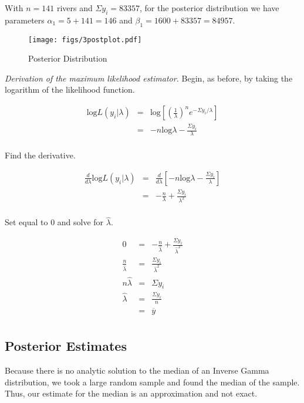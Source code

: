 \documentclass[12pt]{article}
\newcommand{\ybar}{\overline{y}}
\begin{document}
\noindent With $n=141$ rivers and $\Sigma y_i=83357$, for the posterior distribution we have parameters $\alpha_1=5+141=146$ and $\beta_1=1600+83357=84957$. \\ [-.85cm]

\begin{figure}[H]
\begin{center}
\texttt{[image: figs/3postplot.pdf]}
\caption{Posterior Distribution}
\end{center}
\end{figure}

\noindent \textit{Derivation of the maximum likelihood estimator.}  Begin, as before, by taking the logarithm of the likelihood function.

\begin{eqnarray*}
\mathrm{log}L(y_i|\lambda) &=& \mathrm{log}\left[\left(\frac{1}{\lambda}\right)^ne^{-\Sigma y_i/\lambda}\right] \\
&=& -n\mathrm{log}\lambda-\frac{\Sigma y_i}{\lambda} \\
\end{eqnarray*}

\noindent Find the derivative.

\begin{eqnarray*}
\frac{d}{d\lambda}\mathrm{log}L(y_i|\lambda) &=& \frac{d}{d\lambda}\left[-n\mathrm{log}\lambda-\frac{\Sigma y_i}{\lambda}\right] \\
&=& -\frac{n}{\lambda}+\frac{\Sigma y_i}{\lambda^2} \\
\end{eqnarray*}

\noindent Set equal to 0 and solve for $\hat{\lambda}$.

\begin{eqnarray*}
0 &=& -\frac{n}{\hat{\lambda}}+\frac{\Sigma y_i}{\hat{\lambda}^2} \\
\frac{n}{\hat{\lambda}} &=& \frac{\Sigma y_i}{\hat{\lambda}^2} \\
n\hat{\lambda} &=& \Sigma y_i \\
\hat{\lambda} &=& \frac{\Sigma y_i}{n} \\
&=& \ybar \\
\end{eqnarray*}

\subsection{Posterior Estimates}

\noindent Because there is no analytic solution to the median of an Inverse Gamma distribution, we took a large random sample and found the median of the sample.  Thus, our estimate for the median is an approximation and not exact.
\end{document}

